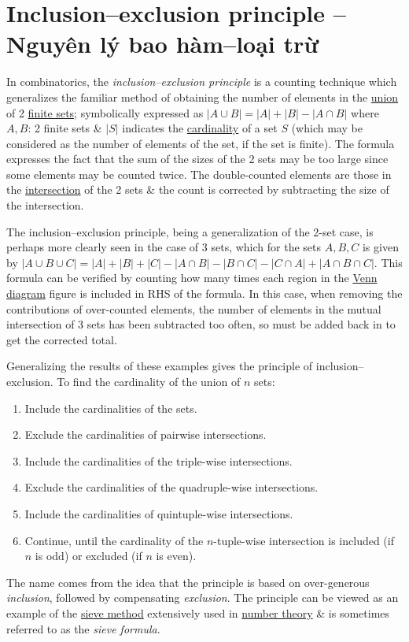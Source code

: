 \documentclass[oneside]{book}
\begin{document}
\section{Inclusion--exclusion principle -- Nguyên lý bao hàm--loại trừ}
In combinatorics, the {\it inclusion--exclusion principle} is a counting technique which generalizes the familiar method of obtaining the number of elements in the \href{https://en.wikipedia.org/wiki/Union_(set_theory)}{union} of 2 \href{https://en.wikipedia.org/wiki/Finite_set}{finite sets}; symbolically expressed as $|A\cup B| = |A| + |B| - |A\cap B|$ where $A,B$: 2 finite sets \& $|S|$ indicates the \href{https://en.wikipedia.org/wiki/Cardinality}{cardinality} of a set $S$ (which may be considered as the number of elements of the set, if the set is finite). The formula expresses the fact that the sum of the sizes of the 2 sets may be too large since some elements may be counted twice. The double-counted elements are those in the \href{https://en.wikipedia.org/wiki/Intersection_(set_theory)}{intersection} of the 2 sets \& the count is corrected by subtracting the size of the intersection.

The inclusion--exclusion principle, being a generalization of the 2-set case, is perhaps more clearly seen in the case of 3 sets, which for the sets $A,B,C$ is given by $|A\cup B\cup C| = |A| + |B| + |C| - |A\cap B| - |B\cap C| - |C\cap A| + |A\cap B\cap C|$. This formula can be verified by counting how many times each region in the \href{https://en.wikipedia.org/wiki/Venn_diagram}{Venn diagram} figure is included in RHS of the formula. In this case, when removing the contributions of over-counted elements, the number of elements in the mutual intersection of 3 sets has been subtracted too often, so must be added back in to get the corrected total.

Generalizing the results of these examples gives the principle of inclusion--exclusion. To find the cardinality of the union of $n$ sets:
\begin{enumerate}
	\item Include the cardinalities of the sets.
	\item Exclude the cardinalities of pairwise intersections.
	\item Include the cardinalities of the triple-wise intersections.
	\item Exclude the cardinalities of the quadruple-wise intersections.
	\item Include the cardinalities of quintuple-wise intersections.
	\item Continue, until the cardinality of the $n$-tuple-wise intersection is included (if $n$ is odd) or excluded (if $n$ is even).
\end{enumerate}
The name comes from the idea that the principle is based on over-generous {\it inclusion}, followed by compensating {\it exclusion}. The principle can be viewed as an example of the \href{https://en.wikipedia.org/wiki/Sieve_theory}{sieve method} extensively used in \href{https://en.wikipedia.org/wiki/Number_theory}{number theory} \& is sometimes referred to as the {\it sieve formula}.
\end{document}
